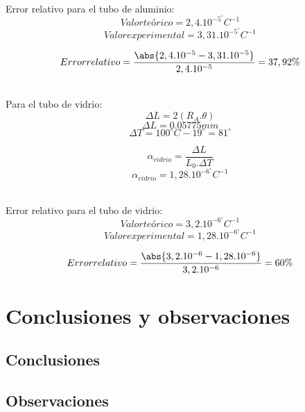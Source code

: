 \documentclass{article}
\begin{document}
\\Error relativo para el tubo de aluminio:\\
$$Valor teórico = 2,4.10^{-5}  ^{\circ}C^{-1}$$
$$Valor experimental = 3,31.10^{-5}  ^{\circ}C^{-1}$$

$$Error relativo = \frac{\abs{2,4.10^{-5} - 3,31.10^{-5}  }}{2,4.10^{-5}} = 37,92 \% $$


\\Para el tubo de vidrio:\\


    $$\Delta L = 2 (R_{A}.\theta)$$
    $$\Delta L = 0.05775 mm$$
    $$\Delta T = 100 ^{\circ}C - 19 ^{\circ}= 81 ^{\circ}$$
    
    $$\alpha_{vidrio} = \frac{\Delta L}{L_{0}.\Delta T}$$
    $$\alpha_{vidrio} = 1,28 . 10^{-6}^{\circ}  C^{-1}$$

\\Error relativo para el tubo de vidrio:\\

$$Valor teórico = 3,2.10^{-6}  ^{\circ}C^{-1}$$
$$Valor experimental = 1,28.10^{-6}  ^{\circ}C^{-1}$$

$$Error relativo = \frac{\abs{3,2.10^{-6} - 1,28.10^{-6}  }}{3,2.10^{-6}} = 60 \% $$

\newpage



\section{Conclusiones y observaciones}
\subsection{Conclusiones}

\subsection{Observaciones}

\newpage

\begin{thebibliography}

\end{thebibliography}
\end{document}
